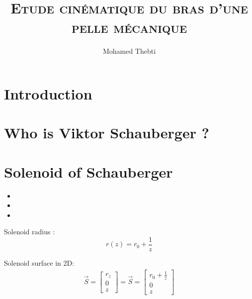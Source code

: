 \documentclass[12pt,a4paper]{article}
\title{
	\Huge\textsc{Etude cinématique du bras d'une pelle mécanique}
}
\author{Mohamed Thebti}
\begin{document}
\setlength{\parindent}{0mm}

\fancyhead[R]{\slshape \leftmark}

\fancyfoot[C]{}
\fancyfoot[R]{\thepage}

\maketitle
\newpage

\tableofcontents

\newpage



\section{Introduction}

\section{Who is Viktor Schauberger ?}

\newpage
\section{Solenoid of Schauberger}

\begin{itemize}
	\item 
	\item 
	\item 
\end{itemize}

Solenoid radius : 
\begin{equation}
r(z)=r_0 + \frac{1}{z}
\end{equation}
\begin{center}
\end{center}
Solenoid surface in 2D: 
\begin{eqnarray}
\vec{S}=\begin{bmatrix}
r_z \\
0\\
z
\end{bmatrix} = 
\vec{S}=\begin{bmatrix}
r_0 + \frac{1}{z} \\
0\\
z
\end{bmatrix}
\end{eqnarray}
\end{document}
